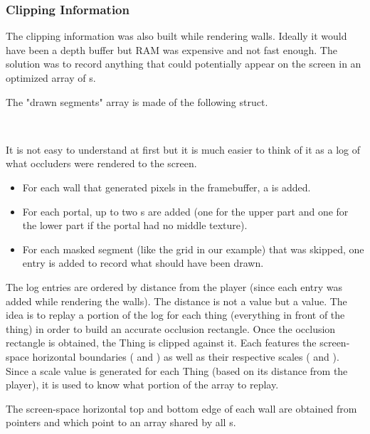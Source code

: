  \subsubsection{Clipping Information}
 The clipping information was also built while rendering walls. Ideally it would have been a depth buffer but RAM was expensive and not fast enough. The solution was to record anything that could potentially appear on the screen in an optimized array of s.\\
\par

The "drawn segments" array  is made of the following  struct.\\
\par
{}\\
\par
It is not easy to understand at first but it is much easier to think of it as a log of what occluders were rendered to the screen.
\begin{itemize} 
	\item For each wall that generated pixels in the framebuffer, a  is added.
	\item For each portal, up to two s are added (one for the upper part and one for the lower part if the portal had no middle texture).
	\item For each masked segment (like the grid  in our example) that was skipped, one  entry is added to record what should have been drawn.
\end{itemize}
The log entries are ordered by distance from the player (since each entry was added while rendering the walls). The distance is not a  value but a  value. The idea is to replay a portion of the log for each thing (everything in front of the thing) in order to build an accurate occlusion rectangle. Once the occlusion rectangle is obtained, the Thing is clipped against it. Each  features the screen-space horizontal boundaries ( and ) as well as their respective scales ( and ). Since a scale value is generated for each Thing (based on its distance from the player), it is used to know what portion of the  array to replay.\\
\par
The screen-space horizontal top and bottom edge of each wall are obtained from pointers  and  which point to an array shared by all s.\\
